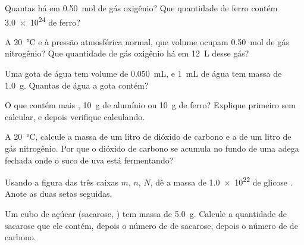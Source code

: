 \begin{exercise}[$\star$]\label{exo:g10:the-mole:4}
Quantas  há em \qty{0.50}{mol} de gás oxigênio? Que quantidade
de ferro contém \num{3.0e24}  de ferro?
\end{exercise}

\begin{exercise}[$\star$]\label{exo:g10:the-mole:5}
A \qty{20}{\celsius} e à pressão atmosférica normal, que volume ocupam
\qty{0.50}{mol} de gás nitrogênio? Que quantidade de gás oxigênio há em
\qty{12}{L} desse gás?
\end{exercise}

\begin{exercise}[$\star\star$]\label{exo:g10:the-mole:6}
Uma gota de água tem volume de \qty{0.050}{mL}, e \qty{1}{mL} de água tem
massa de \qty{1.0}{g}. Quantas  de água a gota contém?
\end{exercise}

\begin{exercise}[$\star\star$]\label{exo:g10:the-mole:7}
O que contém mais , \qty{10}{g} de alumínio ou \qty{10}{g} de
ferro? Explique primeiro sem calcular, e depois verifique calculando.
\end{exercise}

\begin{exercise}[$\star\star$]\label{exo:g10:the-mole:8}
A \qty{20}{\celsius}, calcule a massa de um litro de dióxido de carbono e
a de um litro de gás nitrogênio. Por que o dióxido de carbono se acumula
no fundo de uma adega fechada onde o suco de uva está fermentando?
\end{exercise}

\begin{exercise}[$\star\star$]\label{exo:g10:the-mole:9}
Usando a figura das três caixas $m$, $n$, $N$, dê a massa de
\num{1.0e22}  de glicose . Anote as duas setas
seguidas.
\end{exercise}

\begin{exercise}[$\star\star$]\label{exo:g10:the-mole:10}
Um cubo de açúcar (sacarose, ) tem massa de \qty{5.0}{g}.
Calcule a quantidade de sacarose que ele contém, depois o número de
 de sacarose, depois o número de  de carbono.
\end{exercise}


